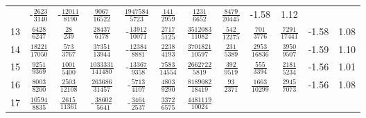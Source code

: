\documentclass[letterpaper,11pt,nointlimits,reqno,draft]{amsbook}
\begin{document}
\begin{table}
\begin{tabular}{r|ccccccccc|c@{ -- }c@{\%}}
& -$\frac{            2623}{            3140}$
& -$\frac{           12011}{            8190}$
&  $\frac{            9067}{           16522}$
&  $\frac{         1947584}{            5723}$
&  $\frac{             141}{            2959}$
&  $\frac{            1231}{            6652}$
&  $\frac{            8479}{           20445}$
&  -1.58 &  1.12
\\
13
&  $\frac{            6428}{            6247}$
&  $\frac{              28}{             239}$
&  $\frac{           28437}{            6178}$
& -$\frac{           13912}{           10071}$
&  $\frac{            2717}{            5125}$
&  $\frac{         3512083}{           11082}$
&  $\frac{             542}{           12275}$
&  $\frac{             701}{            3776}$
&  $\frac{            7291}{           17441}$
&  -1.58 &  1.08
\\
14
&  $\frac{           18221}{           17050}$
&  $\frac{             573}{            3767}$
&  $\frac{           37351}{           13944}$
& -$\frac{           12384}{            8881}$
&  $\frac{            2238}{            4193}$
&  $\frac{         3701821}{           10597}$
&  $\frac{             231}{            5389}$
&  $\frac{            2953}{           16836}$
&  $\frac{            3950}{            9507}$
&  -1.59 &  1.10
\\
15
&  $\frac{            9251}{            9369}$
&  $\frac{            1001}{            5400}$
&  $\frac{         1033331}{          141480}$
& -$\frac{           13367}{            9358}$
&  $\frac{            7583}{           14554}$
&  $\frac{         2662722}{            5819}$
&  $\frac{             392}{            9519}$
&  $\frac{             555}{            3394}$
&  $\frac{            2181}{            5234}$
&  -1.56 &  1.01
\\
16
&  $\frac{            8003}{            8200}$
&  $\frac{            2503}{           12108}$
&  $\frac{          263686}{           31457}$
& -$\frac{            5713}{            4107}$
&  $\frac{            4803}{            9290}$
&  $\frac{         8189082}{           18419}$
&  $\frac{              93}{            2371}$
&  $\frac{            1663}{           10299}$
&  $\frac{            2945}{            7073}$
&  -1.56 &  1.08
\\
17
&  $\frac{           10594}{            8835}$
&  $\frac{            2615}{           11361}$
& -$\frac{           38602}{            5641}$
& -$\frac{            3464}{            2537}$
&  $\frac{            3372}{            6575}$
&  $\frac{         4481119}{           10024}$

\end{tabular}
\end{table}
\end{document}
